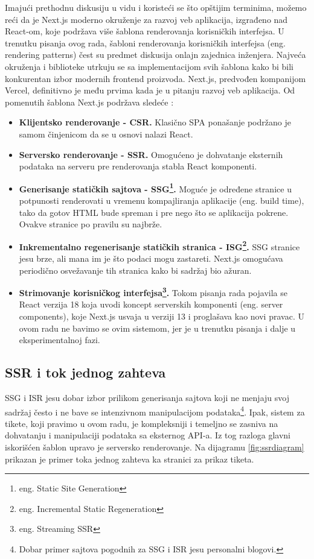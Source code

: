 \documentclass[12pt,oneside]{memoir}
\begin{document}
Imajući prethodnu diskusiju u vidu i koristeći se što opštijim terminima, možemo reći da je Next.js moderno okruženje za razvoj veb aplikacija, izgrađeno nad React-om, koje podržava više šablona renderovanja korisničkih interfejsa. U trenutku pisanja ovog rada, šabloni renderovanja korisničkih interfejsa (eng. rendering patterns) čest su predmet diskusija onlajn zajednica inženjera. Najveća okruženja i biblioteke utrkuju se sa implementacijom svih šablona kako bi bili konkurentan izbor modernih frontend proizvoda. Next.js, predvođen kompanijom Vercel, definitivno je među prvima kada je u pitanju razvoj veb aplikacija. Od pomenutih šablona Next.js podržava sledeće \cite{nextjsdocs}:
\begin{itemize}
    \item \textbf{Klijentsko renderovanje - CSR.} Klasično SPA ponašanje podržano je samom činjenicom da se u osnovi nalazi React.
    \item \textbf{Serversko renderovanje - SSR.} Omogućeno je dohvatanje eksternih podataka na serveru pre renderovanja stabla React komponenti.
    \item \textbf{Generisanje statičkih sajtova - SSG\footnote{eng. Static Site Generation}.} Moguće je određene stranice u potpunosti renderovati u vremenu kompajliranja aplikacije (eng. build time), tako da gotov HTML bude spreman i pre nego što se aplikacija pokrene. Ovakve stranice po pravilu su najbrže.
    \item \textbf{Inkrementalno regenerisanje statičkih stranica - ISG\footnote{eng. Incremental Static Regeneration}.} SSG stranice jesu brze, ali mana im je što podaci mogu zastareti. Next.js omogućava periodično osvežavanje tih stranica kako bi sadržaj bio ažuran.
    \item \textbf{Strimovanje korisničkog interfejsa\footnote{eng. Streaming SSR}.} Tokom pisanja rada pojavila se React verzija 18 koja uvodi koncept serverskih komponenti (eng. server components), koje Next.js usvaja u verziji 13 i proglašava kao novi pravac. U ovom radu ne bavimo se ovim sistemom, jer je u trenutku pisanja i dalje u eksperimentalnoj fazi.
\end{itemize}

\subsection{SSR i tok jednog zahteva}

SSG i ISR jesu dobar izbor prilikom generisanja sajtova koji ne menjaju svoj sadržaj često i ne bave se intenzivnom manipulacijom podataka\footnote{Dobar primer sajtova pogodnih za SSG i ISR jesu personalni blogovi.}. Ipak, sistem za tikete, koji pravimo u ovom radu, je kompleksniji i temeljno se zasniva na dohvatanju i manipulaciji podataka sa eksternog API-a. Iz tog razloga glavni iskorišćen šablon upravo je serversko renderovanje. Na dijagramu \ref{fig:ssrdiagram} prikazan je primer toka jednog zahteva ka stranici za prikaz tiketa.
\end{document}
